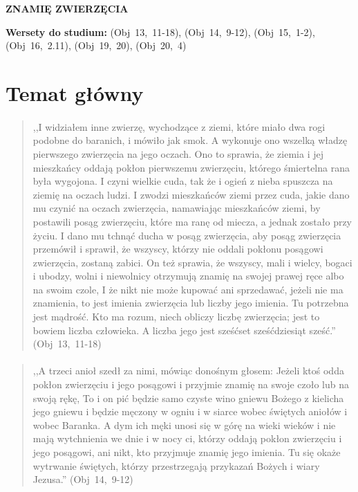 \documentclass[10pt,a4paper,oneside]{article}
\begin{document}
\centerline{\textbf{\MakeUppercase{Znamię Zwierzęcia}}}
\begin{center}
\textbf{Wersety do studium:} \mbox{(Obj 13, 11-18)}, \mbox{(Obj 14, 9-12)}, \mbox{(Obj 15, 1-2)}, \mbox{(Obj 16, 2.11)}, \mbox{(Obj 19, 20)}, \mbox{(Obj 20, 4)}
\end{center}
\section{Temat główny}
\paragraph{}
\begin{quote}
,,I widziałem inne zwierzę, wychodzące z ziemi, które miało dwa rogi podobne do baranich, i mówiło jak smok. A wykonuje ono wszelką władzę pierwszego zwierzęcia na jego oczach. Ono to sprawia, że ziemia i jej mieszkańcy oddają pokłon pierwszemu zwierzęciu, którego śmiertelna rana była wygojona. I czyni wielkie cuda, tak że i ogień z nieba spuszcza na ziemię na oczach ludzi. I zwodzi mieszkańców ziemi przez cuda, jakie dano mu czynić na oczach zwierzęcia, namawiając mieszkańców ziemi, by postawili posąg zwierzęciu, które ma ranę od miecza, a jednak zostało przy życiu. I dano mu tchnąć ducha w posąg zwierzęcia, aby posąg zwierzęcia przemówił i sprawił, że wszyscy, którzy nie oddali pokłonu posągowi zwierzęcia, zostaną zabici. On też sprawia, że wszyscy, mali i wielcy, bogaci i ubodzy, wolni i niewolnicy otrzymują znamię na swojej prawej ręce albo na swoim czole, I że nikt nie może kupować ani sprzedawać, jeżeli nie ma znamienia, to jest imienia zwierzęcia lub liczby jego imienia. Tu potrzebna jest mądrość. Kto ma rozum, niech obliczy liczbę zwierzęcia; jest to bowiem liczba człowieka. A liczba jego jest sześćset sześćdziesiąt sześć.'' \mbox{(Obj 13, 11-18)}
\end{quote}
\paragraph{}
\begin{quote}
,,A trzeci anioł szedł za nimi, mówiąc donośnym głosem: Jeżeli ktoś odda pokłon zwierzęciu i jego posągowi i przyjmie znamię na swoje czoło lub na swoją rękę, To i on pić będzie samo czyste wino gniewu Bożego z kielicha jego gniewu i będzie męczony w ogniu i w siarce wobec świętych aniołów i wobec Baranka. A dym ich męki unosi się w górę na wieki wieków i nie mają wytchnienia we dnie i w nocy ci, którzy oddają pokłon zwierzęciu i jego posągowi, ani nikt, kto przyjmuje znamię jego imienia. Tu się okaże wytrwanie świętych, którzy przestrzegają przykazań Bożych i wiary Jezusa.'' \mbox{(Obj 14, 9-12)}
\end{quote}
\end{document}
